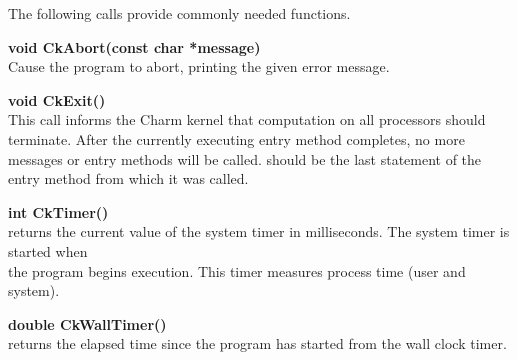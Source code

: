 The following calls provide commonly needed functions.

{\bf void CkAbort(const char *message)}  \\
Cause the program to abort, printing the given error message.

{\bf void CkExit()}  \\
This call informs the Charm kernel that computation on all processors should 
terminate.  After the currently executing entry method completes, no more 
messages or entry methods will be called.   should be the 
last statement of the entry method from which it was called. 

{\bf int CkTimer()}   \\
returns the current value of the system timer in milliseconds. The system
timer is started when \\
the program begins execution. This timer measures
process time (user and system).

{\bf double CkWallTimer()}   \\
returns the elapsed time since the program has started from the wall clock 
timer.

